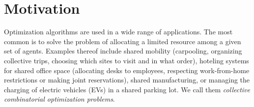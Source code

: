 \documentclass[german, a4paper, 11pt, oneside]{scrbook}
\begin{document}
\chapter{Motivation}
\label{sec:motivation}
Optimization algorithms are used in a wide range of applications. The most common is to solve the problem of allocating a limited resource among a given set of agents. \cite{Chen.30.01.2021} Examples thereof include shared mobility (carpooling, organizing collective trips, choosing which sites to visit and in what order), hoteling systems for shared office space (allocating desks to employees, respecting work-from-home restrictions or making joint reservations), shared manufacturing, or managing the charging of electric vehicles (EVs) in a shared parking lot. We call them \emph{collective combinatorial optimization problems}. \\
\end{document}
